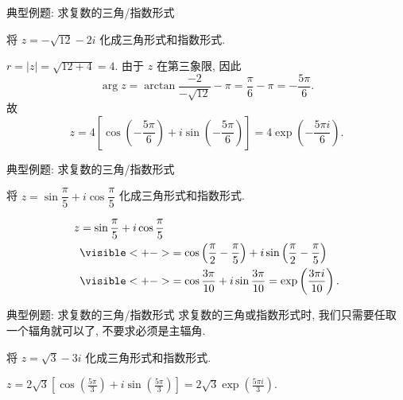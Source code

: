 \begin{frame}{典型例题: 求复数的三角/指数形式}
\onslide<+->
\begin{example}
将 $z=-\sqrt{12}-2i$ 化成三角形式和指数形式.
\end{example}
\onslide<+->
\begin{solution}
$r=|z|=\sqrt{12+4}=4$.
\onslide<+->
由于 $z$ 在第三象限,
\onslide<+->
因此
\[\arg z=\arctan\frac{-2}{-\sqrt{12}}-\pi=\frac\pi6-\pi=-\frac{5\pi}6.\]
\onslide<+->
故
\[z=4\left[\cos\left(-\frac{5\pi}6\right)+i\sin\left(-
\frac{5\pi}6\right)\right]=4\exp\left(-\frac{5\pi i}6\right).\]
\end{solution}
\end{frame}


\begin{frame}{典型例题: 求复数的三角/指数形式}
\onslide<+->
\begin{example}
将 $z=\sin\dfrac\pi5+i\cos\dfrac\pi5$ 化成三角形式和指数形式.
\end{example}
\onslide<+->
\begin{solution}
\vspace{-\baselineskip}
\begin{align*}
z&=\sin\frac\pi5+i\cos\frac\pi5\\
&\visible<+->{=\cos\left(\frac\pi2-\frac\pi5\right)+i\sin\left(\frac\pi2-\frac\pi5\right)}\\
&\visible<+->{=\cos\frac{3\pi}{10}+i\sin\frac{3\pi}{10}=\exp\left(\frac{3\pi i}{10}\right).}
\end{align*}
\end{solution}
\end{frame}


\begin{frame}{典型例题: 求复数的三角/指数形式}
\onslide<+->
求复数的三角或指数形式时, 我们只需要任取一个辐角就可以了, 不要求必须是主辐角.
\onslide<+->
\begin{exercise}
将 $z=\sqrt 3-3i$ 化成三角形式和指数形式.
\end{exercise}
\onslide<+->
\begin{answer}
$\displaystyle z=2\sqrt3\left[\cos\left(\frac{5\pi}3\right)+i\sin\left(\frac{5\pi}3\right)\right]
=2\sqrt3\exp\left(\frac{5\pi i}3\right)$.
\end{answer}
\end{frame}


